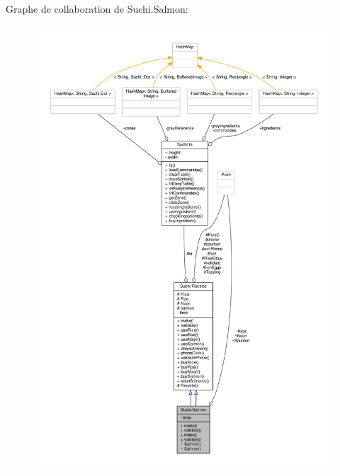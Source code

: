 Graphe de collaboration de Suchi.\+Salmon\+:\nopagebreak
\begin{figure}[H]
\begin{center}
\leavevmode
\includegraphics[width=350pt]{classSuchi_1_1Salmon__coll__graph}
\end{center}
\end{figure}
